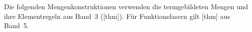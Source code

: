 Die folgenden Mengenkonstruktionen verwenden die termgebildeten Mengen
und ihre Elementregeln aus Band~3
([thm]). Für Funktionsfasern gilt
[thm] aus Band~5.
